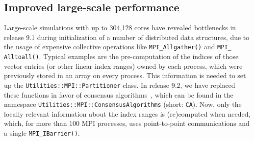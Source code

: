 \documentclass{ansarticle-preprint}
\begin{document}



\subsection{Improved large-scale performance}
\label{subsec:performance}

Large-scale simulations with up to 304,128 cores have revealed bottlenecks in release
9.1 during initialization of a number of distributed data structures, due to the usage of expensive collective operations
like \texttt{MPI\_Allgather()} and \texttt{MPI\_\allowbreak
  Alltoall()}. Typical examples are the
pre-computation of the indices of those vector entries (or
other linear index ranges) owned by
each process, which were previously stored in  an array on every process.
This information is needed to set up
the  \texttt{Utilities::MPI::Par\-ti\-ti\-oner} class.
In release 9.2, we have replaced these functions in favor of
consensus algorithms~\cite{hoefler2010scalable}, which can be
found in the namespace \texttt{Utilities::\allowbreak MPI::\allowbreak ConsensusAlgorithms} (short: \texttt{CA}).
Now, only the locally relevant information about the index ranges is
(re)computed when needed, which, for more than 100 MPI processes, uses
point-to-point communications and a single \texttt{MPI\_IBarrier()}.

\end{document}
